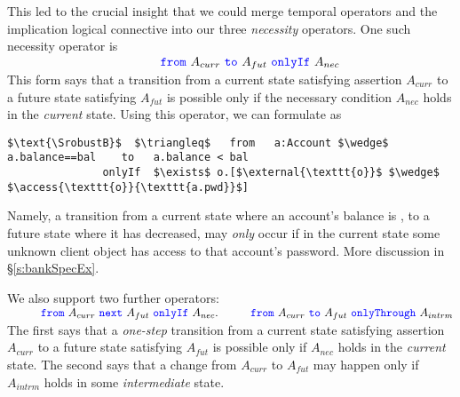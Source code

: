   
  {This led to the  crucial insight that we could merge  temporal operators and the implication 
 logical connective into our three}
  \emph{necessity} operators. 
 One such necessity operator is \\
$ 
\strut \hspace{1.7in} {\color{blue}\texttt{from}}\ A_{curr}\ {\color{blue}\texttt{to}}\ A_{fut}\ {\color{blue}\texttt{onlyIf}}\ A_{nec}
$  
\\
This form says that  
a  {transition} from a current state satisfying assertion $A_{curr}$ to a future
state satisfying $A_{fut}$  is possible only if  the   necessary 
condition
$A_{nec}$ holds in the \emph{current} state.
Using this operator, we can formulate  \SrobustB  
as
\begin{lstlisting}[language = Chainmail, mathescape=true, frame=lines]
   $\text{\SrobustB}$  $\triangleq$   from   a:Account $\wedge$ a.balance==bal    to   a.balance < bal
               onlyIf  $\exists$ o.[$\external{\texttt{o}}$ $\wedge$ $\access{\texttt{o}}{\texttt{a.pwd}}$]
\end{lstlisting}
Namely, a transition from a  {current} state where an account's balance is , to a  {future} state where 
it has decreased, may \emph{only} occur if  {in the current state} some unknown client object  
has access to that account's password. 
More discussion in \S\ref{s:bankSpecEx}. 


We also support two further \Nec operators:
\\
$ 
\strut \hspace{.4in} {\color{blue}\texttt{from}}\ A_{curr}\ {\color{blue}\texttt{next}}\ A_{fut}\ {\color{blue}\texttt{onlyIf}}\ A_{nec}. \strut \hspace{.4in} {\color{blue}\texttt{from}}\ A_{curr}\ {\color{blue}\texttt{to}}\ A_{fut}\ {\color{blue}\texttt{onlyThrough}}\ A_{intrm}
$ 
\\
{The  first says    that 
a  \emph{one-step} {transition} from a current state satisfying assertion $A_{curr}$ to a future
state satisfying $A_{fut}$  
is possible only if %
$A_{nec}$ holds in the \emph{current} state.   
The   second says that a change from %
 $A_{curr}$ to  $A_{fut}$  may happen only if %
 $A_{intrm}$ holds in some \emph{intermediate} state.}
 
